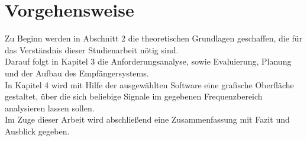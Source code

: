 \section{Vorgehensweise}
Zu Beginn werden in Abschnitt 2 die theoretischen Grundlagen geschaffen, die für das Verständnis dieser Studienarbeit nötig sind. \\
Darauf folgt in Kapitel 3 die Anforderungsanalyse, sowie Evaluierung, Planung und der Aufbau des Empfängersystems.\\
In Kapitel 4 wird mit Hilfe der ausgewählten Software eine grafische Oberfläche gestaltet, über die sich beliebige Signale im gegebenen Frequenzbereich analysieren lassen sollen.\\
Im Zuge dieser Arbeit wird abschließend eine Zusammenfassung mit Fazit und Ausblick gegeben.










